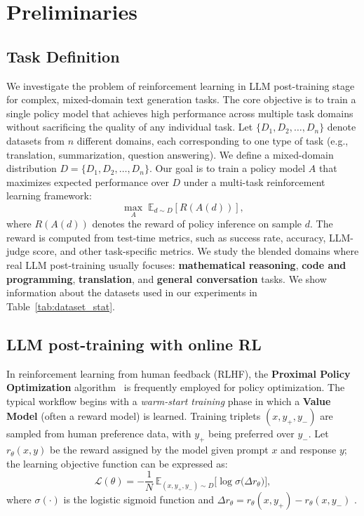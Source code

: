 \section{Preliminaries}

\subsection{Task Definition} \label{sec:task_definition}

We investigate the problem of reinforcement learning in LLM post-training stage for complex, mixed-domain text generation tasks. The core objective is to train a single policy model that achieves high performance across multiple task domains without sacrificing the quality of any individual task.
Let \(\{ D_1, D_2, \dots, D_n \}\) denote datasets from \(n\) different domains, each corresponding to one type of task (e.g., translation, summarization, question answering).  
We define a mixed-domain distribution \(D = \{ D_1, D_2, \dots, D_n \}\).
Our goal is to train a policy model \(A\) that maximizes expected performance over \(D\) under a multi-task reinforcement learning framework:  
\[
\max_{A} \; \mathbb{E}_{d \sim D} \left[ R(A(d)) \right],
\]  
where \(R(A(d))\) denotes the reward of policy inference on sample \(d\). The reward is computed from test-time metrics, such as success rate, accuracy, LLM-judge score, and other task-specific metrics. 
We study the blended domains where real LLM post-training usually focuses: \textbf{mathematical reasoning}, \textbf{code and programming}, \textbf{translation}, and \textbf{general conversation} tasks. We show information about the datasets used in our experiments in Table~\ref{tab:dataset_stat}.


\subsection{LLM post-training with online RL} \label{sec:rl_algo}


In reinforcement learning from human feedback (RLHF), the \textbf{Proximal Policy Optimization} algorithm~\citep{ppo} is frequently employed for policy optimization.  
The typical workflow begins with a \textit{warm-start training} phase in which a \textbf{Value Model} (often a reward model) is learned. Training triplets \((x, y_{+}, y_{-})\) are sampled from human preference data, with \(y_{+}\) being preferred over \(y_-\). Let \(r_{\theta}(x, y)\) be the reward assigned by the model given prompt \(x\) and response \(y\); the learning objective function can be expressed as:
\begin{equation*}
    \mathcal{L}(\theta) = -\frac{1}{N} \,\mathbb{E}_{(x,y_+, y_-) \sim D } \bigg[ \log \sigma \big( \Delta r_{\theta} \big) \bigg],
\end{equation*}
where \(\sigma(\cdot)\) is the logistic sigmoid function and \(\Delta r_{\theta} = r_{\theta}(x, y_+) - r_{\theta}(x, y_-)\)  .

